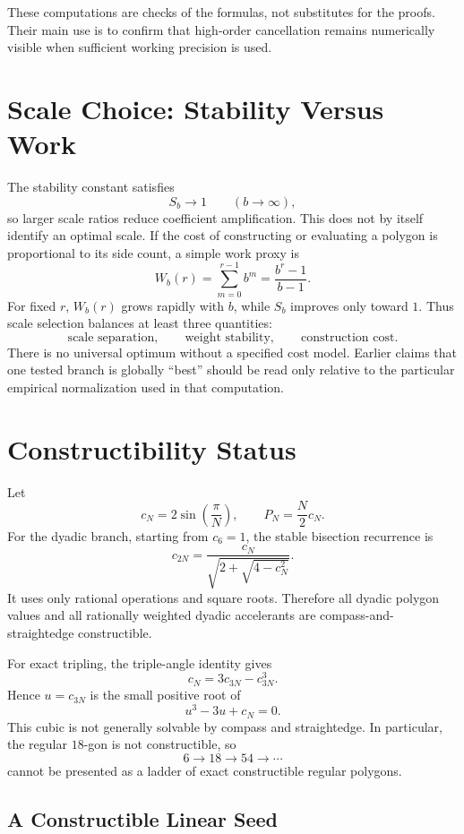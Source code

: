 \documentclass[11pt]{article}
\theoremstyle{remark}
\begin{document}
These computations are checks of the formulas, not substitutes for the
proofs.  Their main use is to confirm that high-order cancellation remains
numerically visible when sufficient working precision is used.

\section{Scale Choice: Stability Versus Work}

The stability constant satisfies
\[
  S_b\longrightarrow1\qquad(b\to\infty),
\]
so larger scale ratios reduce coefficient amplification.  This does not by
itself identify an optimal scale.  If the cost of constructing or evaluating a
polygon is proportional to its side count, a simple work proxy is
\[
  W_b(r)=\sum_{m=0}^{r-1}b^m=\frac{b^r-1}{b-1}.
\]
For fixed $r$, $W_b(r)$ grows rapidly with $b$, while $S_b$ improves only
toward $1$.  Thus scale selection balances at least three quantities:
\[
  \text{scale separation},\qquad
  \text{weight stability},\qquad
  \text{construction cost}.
\]
There is no universal optimum without a specified cost model.  Earlier claims
that one tested branch is globally ``best'' should be read only relative to
the particular empirical normalization used in that computation.

\section{Constructibility Status}

Let
\[
  c_N=2\sin\!\left(\frac{\pi}{N}\right),
  \qquad P_N=\frac{N}{2}c_N.
\]
For the dyadic branch, starting from $c_6=1$, the stable bisection recurrence is
\[
  c_{2N}
  =\frac{c_N}{\sqrt{2+\sqrt{4-c_N^2}}}.
\]
It uses only rational operations and square roots.  Therefore all dyadic
polygon values and all rationally weighted dyadic accelerants are
compass-and-straightedge constructible.

For exact tripling, the triple-angle identity gives
\[
  c_N=3c_{3N}-c_{3N}^3.
\]
Hence $u=c_{3N}$ is the small positive root of
\[
  u^3-3u+c_N=0.
\]
This cubic is not generally solvable by compass and straightedge.  In
particular, the regular $18$-gon is not constructible, so
\[
  6\to18\to54\to\cdots
\]
cannot be presented as a ladder of exact constructible regular polygons.

\subsection{A Constructible Linear Seed}
\end{document}
